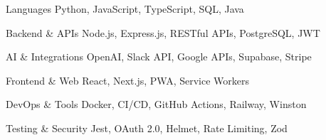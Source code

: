 \documentclass[12pt, letterpaper]{russell}
\begin{document}
\begin{minipage}[t]{0.48\textwidth}
\begin{cvskills}
  \cvskill
    {Languages} %
    {Python, JavaScript, TypeScript, SQL, Java} %

  \cvskill
    {Backend \& APIs} %
    {Node.js, Express.js, RESTful APIs, PostgreSQL, JWT} %

  \cvskill
    {AI \& Integrations} %
    {OpenAI, Slack API, Google APIs, Supabase, Stripe} %
\end{cvskills}
\end{minipage}
\hfill
\begin{minipage}[t]{0.48\textwidth}
\begin{cvskills}
  \cvskill
    {Frontend \& Web} %
    {React, Next.js, PWA, Service Workers} %

  \cvskill
    {DevOps \& Tools} %
    {Docker, CI/CD, GitHub Actions, Railway, Winston} %

  \cvskill
    {Testing \& Security} %
    {Jest, OAuth 2.0, Helmet, Rate Limiting, Zod} %
\end{cvskills}
\end{minipage}

\end{document}
